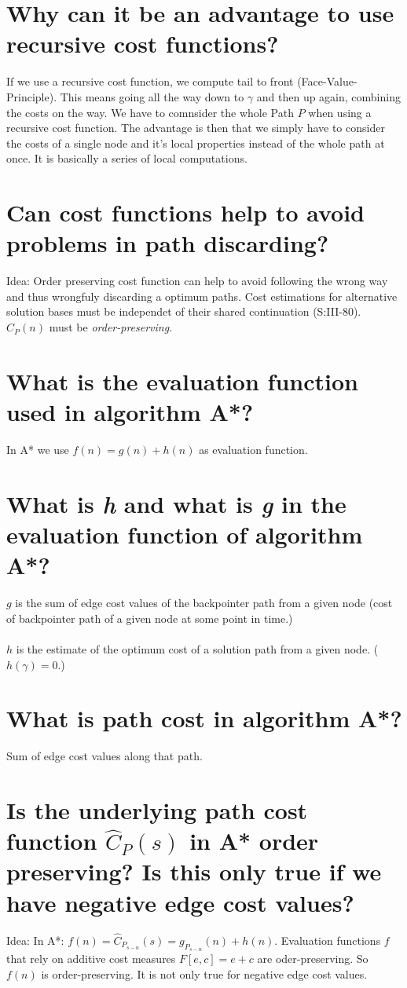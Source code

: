 \documentclass[12pt, a4paper]{article}
\begin{document}
\section{Why can it be an advantage to use recursive cost functions?}
If we use a recursive cost function, we compute tail to front (Face-Value-Principle). This means going all the way down to $\gamma$ and then up again, combining the costs on the way. We have to comnsider the whole Path $P$ when using a recursive cost function. The advantage is then that we simply have to consider the costs of a single node and it's local properties instead of the whole path at once. It is basically a series of local computations.

\section{Can cost functions help to avoid problems in path discarding?}
Idea: Order preserving cost function can help to avoid following the wrong way and thus wrongfuly discarding a optimum paths.
Cost estimations for alternative solution bases must be independet of their shared continuation (S:III-80). $\hat{C}_P(n)$ must be \textit{order-preserving}.

\section{What is the evaluation function used in algorithm A*?}
In A* we use $f(n) = g(n) + h(n)$ as evaluation function.

\section{What is \textit{h} and what is \textit{g} in the evaluation function of algorithm A*?}
$g$ is the sum of edge cost values of the backpointer path from a given node (cost of backpointer path of a given node at some point in time.) \\\\
$h$ is the estimate of the optimum cost of a solution path from a given node. ($h(\gamma) = 0$.)

\section{What is path cost in algorithm A*?}
Sum of edge cost values along that path.

\section{Is the underlying path cost function $\hat{C}_P(s)$ in A* order preserving? Is this only true if we have
negative edge cost values?}
Idea: In A*: $f(n) = \hat{C}_{P_{s-n}}(s) = g_{P_{s-n}}(n) + h(n)$. Evaluation functions $f$ that rely on additive cost measures $F[e, c] = e + c$ are  oder-preserving. So $f(n)$ is order-preserving. It is not only true for negative edge cost values.
\end{document}
